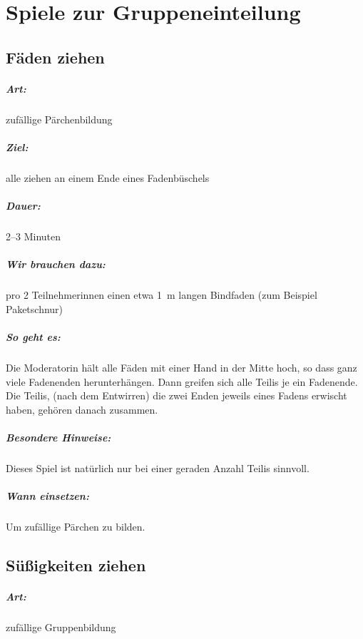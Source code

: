 \chapter{Spiele zur Gruppeneinteilung}

\section{Fäden ziehen}
\paragraph{Art:} zufällige Pärchenbildung
\paragraph{Ziel:} alle ziehen an einem Ende eines Fadenbüschels
\paragraph{Dauer:} 2--3 Minuten
\paragraph{Wir brauchen dazu:} pro 2 Teilnehmerinnen ei\-nen etwa 1~m langen Bindfaden (zum Beispiel Paketschnur)
\paragraph{So geht es:} Die Moderatorin hält alle Fäden mit einer Hand in der Mitte hoch, so dass ganz viele Fadenenden herunterhängen. Dann greifen sich alle Teilis je ein Fadenende. Die Teilis, (nach dem Entwirren) die zwei Enden jeweils eines Fadens erwischt haben, gehören danach zusammen.
\paragraph{Besondere Hinweise:} Dieses Spiel ist natürlich nur bei einer geraden Anzahl Teilis sinnvoll.
\paragraph{Wann einsetzen:} Um zufällige Pärchen zu bilden.

\section{Süßigkeiten ziehen}
\paragraph{Art:} zufällige Gruppenbildung
